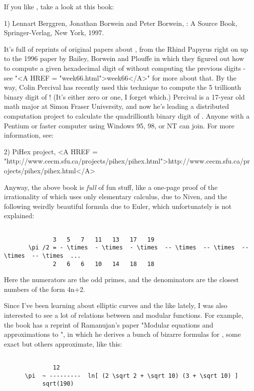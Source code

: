 

If you like \pi , take a look at this book:

1) Lennart Berggren, Jonathan Borwein and Peter Borwein, \Pi : A Source
Book, Springer-Verlag, New York, 1997.

It's full of reprints of original papers about \pi , from the Rhind
Papyrus right on up to the 1996 paper by Bailey, Borwein and Plouffe in
which they figured out how to compute a given hexadecimal digit of \pi 
without computing the previous digits - see "<A HREF = "week66.html">week66</A>" for more about
that.  By the way, Colin Percival has recently used this technique to
compute the 5 trillionth binary digit of \pi !  (It's either zero or one,
I forget which.)  Percival is a 17-year old math major at Simon Fraser
University, and now he's leading a distributed computation project to
calculate the quadrillionth binary digit of \pi .  Anyone with a Pentium
or faster computer using Windows 95, 98, or NT can join.   For more
information, see:

2) PiHex project, <A HREF = "http://www.cecm.sfu.ca/projects/pihex/pihex.html">http://www.cecm.sfu.ca/projects/pihex/pihex.html</A>

Anyway, the above book is \emph{full} of fun stuff, like a one-page proof 
of the irrationality of \pi  which uses only elementary calculus, due 
to Niven, and the following weirdly beautiful formula due to Euler, 
which unfortunately is not explained:


\begin{verbatim}

              3   5   7   11   13   17   19
       \pi /2 = - \times  - \times  - \times  -- \times  -- \times  -- \times  -- \times  ...
              2   6   6   10   14   18   18
\end{verbatim}
    
Here the numerators are the odd primes, and the denominators are the
closest numbers of the form 4n+2.  

Since I've been learning about elliptic curves and the like lately, I
was also interested to see a lot of relations between \pi  and modular
functions.  For example, the book has a reprint of Ramanujan's  paper
"Modular equations and approximations to \pi ", in which he derives  a
bunch of bizarre formulas for \pi , some exact but others approximate,
like this:


\begin{verbatim}

              12
      \pi  ~ ---------  ln[ (2 \sqrt 2 + \sqrt 10) (3 + \sqrt 10) ]
           sqrt(190)
\end{verbatim}
    
